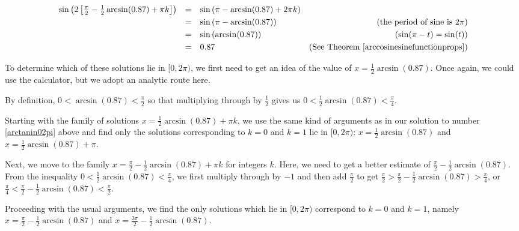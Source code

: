\documentclass{ximera}
\begin{document}
\begin{example}
\begin{enumerate}
\[ \begin{array}{rclr}

\sin\left(2\left[\frac{\pi}{2} - \frac{1}{2} \arcsin(0.87) + \pi k\right]\right)  &  = & \sin\left(\pi - \arcsin(0.87) + 2\pi k\right) & \\ [3pt]
																												& =  & \sin\left(\pi - \arcsin(0.87)\right) & \text{(the period of sine is $2\pi$)} \\ [3pt]
																												& =  & \sin\left(\arcsin(0.87)\right) & \text{($\sin(\pi - t) = \sin(t)$)} \\ [3pt]
																												& =  & 0.87& (\text{See Theorem } \ref{arccosinesinefunctionprops}) \\
																								
\end{array}\] 

To determine which of these solutions lie in $[0,2\pi)$, we first need to get an idea of the value of $x=\frac{1}{2} \arcsin(0.87)$.  Once again, we could use the calculator, but we adopt an analytic route here.  

\smallskip

By definition, $0 < \arcsin(0.87) < \frac{\pi}{2}$ so that multiplying through by $\frac{1}{2}$ gives us $0 < \frac{1}{2} \arcsin(0.87) < \frac{\pi}{4}$.  

\smallskip

Starting with the family of solutions $x = \frac{1}{2} \arcsin(0.87) + \pi k$, we use the same kind of arguments as in our solution to number \ref{arctanin02pi} above and find only the solutions corresponding to $k =0$ and $k=1$ lie in $[0,2\pi)$:  $x = \frac{1}{2} \arcsin(0.87)$ and $x = \frac{1}{2} \arcsin(0.87) + \pi$. 

\smallskip

 Next, we move to the family $x =\frac{\pi}{2} -  \frac{1}{2}\arcsin(0.87) + \pi k$ for integers $k$. Here, we need to get a better estimate of $\frac{\pi}{2} - \frac{1}{2} \arcsin(0.87)$.  From the inequality $0 < \frac{1}{2}\arcsin(0.87) < \frac{\pi}{4}$, we first multiply through by $-1$ and then add $\frac{\pi}{2}$ to get $\frac{\pi}{2} > \frac{\pi}{2} -\frac{1}{2} \arcsin(0.87) >  \frac{\pi}{4}$, or $\frac{\pi}{4} < \frac{\pi}{2} -\frac{1}{2} \arcsin(0.87) < \frac{\pi}{2}$.  
 
 \smallskip
 
 Proceeding with the usual arguments, we find the only solutions which lie in $[0,2\pi)$ correspond to $k = 0$ and $k=1$, namely $x =\frac{\pi}{2} -  \frac{1}{2}\arcsin(0.87)$ and  $x = \frac{3\pi}{2} - \frac{1}{2}\arcsin(0.87)$. 
 

\end{enumerate}
\end{example}
\end{document}
